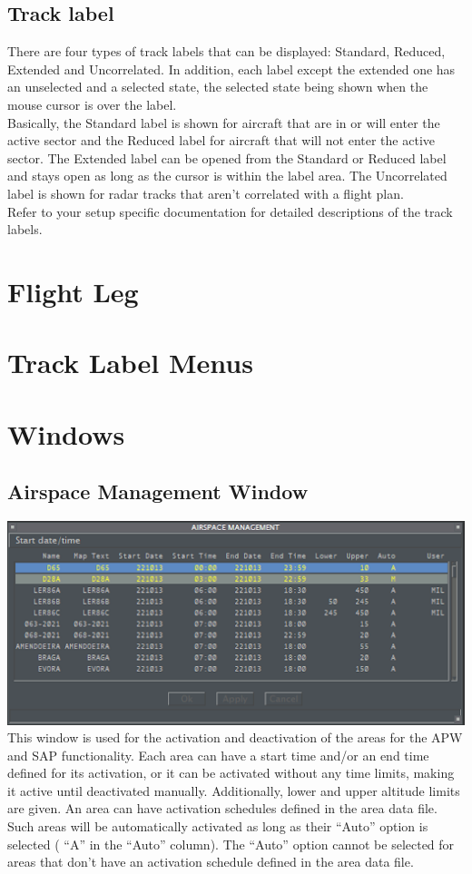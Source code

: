\documentclass[11pt,a4paper,oldfontcommands]{memoir}
\begin{document}
\subsection{Track label}
There are four types of track labels that can be displayed: Standard, Reduced, Extended and Uncorrelated.
In addition, each label except the extended one has an unselected and a selected state, the selected state
being shown when the mouse cursor is over the label.\\
Basically, the Standard label is shown for aircraft that are in or will enter the active sector and the Reduced
label for aircraft that will not enter the active sector. The Extended label can be opened from the Standard
or Reduced label and stays open as long as the cursor is within the label area. The Uncorrelated label is
shown for radar tracks that aren’t correlated with a flight plan.\\
Refer to your setup specific documentation for detailed descriptions of the track labels.\\

\section{Flight Leg}

\section{Track Label Menus}

\section{Windows}

\subsection{Airspace Management Window}
\label{menu:tsa}
\includegraphics{img/tsa.png}\\
This window is used for the activation and deactivation of the areas for the APW and SAP functionality. Each area can have a start time and/or an end time defined for its activation, or it can be activated without any time limits, making it active until deactivated manually. Additionally, lower and upper altitude limits are given. An area can have activation schedules defined in the area data file. Such areas will be automatically activated as long as their “Auto” option is selected ( “A” in the “Auto” column). The “Auto” option cannot be selected for areas that don’t have an activation schedule defined in the area data file.
\end{document}
